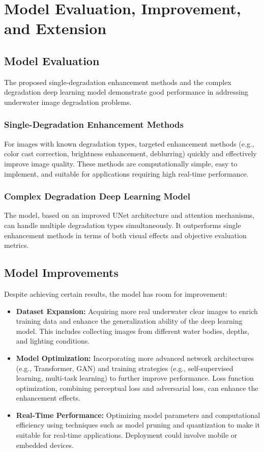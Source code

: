 \documentclass{apmcmthesis}
\begin{document}
\section{Model Evaluation, Improvement, and Extension}
\subsection{Model Evaluation}
The proposed single-degradation enhancement methods and the complex degradation deep learning model demonstrate good performance in addressing underwater image degradation problems.

\subsubsection{Single-Degradation Enhancement Methods}
For images with known degradation types, targeted enhancement methods (e.g., color cast correction, brightness enhancement, deblurring) quickly and effectively improve image quality. These methods are computationally simple, easy to implement, and suitable for applications requiring high real-time performance.

\subsubsection{Complex Degradation Deep Learning Model}
The model, based on an improved UNet architecture and attention mechanisms, can handle multiple degradation types simultaneously. It outperforms single enhancement methods in terms of both visual effects and objective evaluation metrics.

\subsection{Model Improvements}
Despite achieving certain results, the model has room for improvement:
\begin{itemize}
    \item \textbf{Dataset Expansion:} Acquiring more real underwater clear images to enrich training data and enhance the generalization ability of the deep learning model. This includes collecting images from different water bodies, depths, and lighting conditions.
    \item \textbf{Model Optimization:} Incorporating more advanced network architectures (e.g., Transformer, GAN) and training strategies (e.g., self-supervised learning, multi-task learning) to further improve performance. Loss function optimization, combining perceptual loss and adversarial loss, can enhance the enhancement effects.
    \item \textbf{Real-Time Performance:} Optimizing model parameters and computational efficiency using techniques such as model pruning and quantization to make it suitable for real-time applications. Deployment could involve mobile or embedded devices.
\end{itemize}
\end{document}
